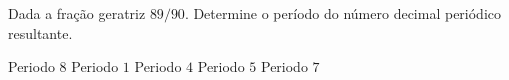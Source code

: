 Dada a fração geratriz $89/90$. Determine o período do número decimal periódico resultante.

Periodo $8$
Periodo $1$
Periodo $4$
Periodo $5$
Periodo $7$



